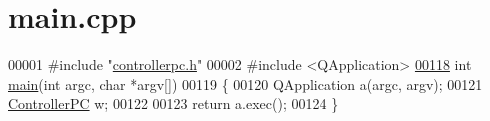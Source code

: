 \hypertarget{main_8cpp_source}{\section{main.\-cpp}
}

\begin{DoxyCode}
00001 \textcolor{preprocessor}{#include "\hyperlink{controllerpc_8h}{controllerpc.h}"}
00002 \textcolor{preprocessor}{#include <QApplication>}
\hypertarget{main_8cpp_source_l00118}{}\hyperlink{main_8cpp_a0ddf1224851353fc92bfbff6f499fa97}{00118} \textcolor{keywordtype}{int} \hyperlink{main_8cpp_a0ddf1224851353fc92bfbff6f499fa97}{main}(\textcolor{keywordtype}{int} argc, \textcolor{keywordtype}{char} *argv[])
00119 \{
00120     QApplication a(argc, argv);
00121     \hyperlink{class_controller_p_c}{ControllerPC} w;
00122 
00123     \textcolor{keywordflow}{return} a.exec();
00124 \}
\end{DoxyCode}
